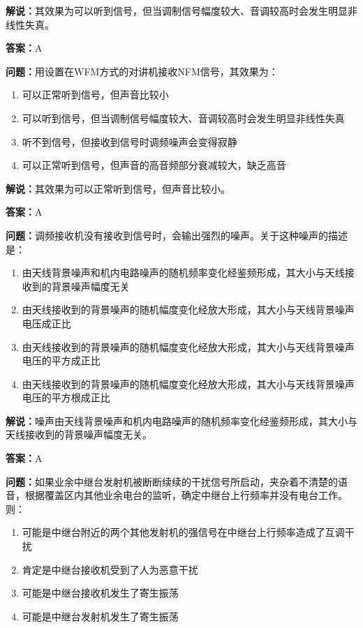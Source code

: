 \textbf{解说：}其效果为可以听到信号，但当调制信号幅度较大、音调较高时会发生明显非线性失真。%

\textbf{答案：}A

\textbf{问题：}用设置在WFM方式的对讲机接收NFM信号，其效果为：

\begin{enumerate}[label=\Alph*), leftmargin=3em]
	\item 可以正常听到信号，但声音比较小
	\item 可以听到信号，但当调制信号幅度较大、音调较高时会发生明显非线性失真
	\item 听不到信号，但接收到信号时调频噪声会变得寂静
	\item 可以正常听到信号，但声音的高音频部分衰减较大，缺乏高音
\end{enumerate}

\textbf{解说：}其效果为可以正常听到信号，但声音比较小。%

\textbf{答案：}A

\textbf{问题：}调频接收机没有接收到信号时，会输出强烈的噪声。关于这种噪声的描述是：

\begin{enumerate}[label=\Alph*), leftmargin=3em]
	\item 由天线背景噪声和机内电路噪声的随机频率变化经鉴频形成，其大小与天线接收到的背景噪声幅度无关
	\item 由天线接收到的背景噪声的随机幅度变化经放大形成，其大小与天线背景噪声电压成正比
	\item 由天线接收到的背景噪声的随机幅度变化经放大形成，其大小与天线背景噪声电压的平方成正比
	\item 由天线接收到的背景噪声的随机幅度变化经放大形成，其大小与天线背景噪声电压的平方根成正比
\end{enumerate}

\textbf{解说：}噪声由天线背景噪声和机内电路噪声的随机频率变化经鉴频形成，其大小与天线接收到的背景噪声幅度无关。%

\textbf{答案：}A

\textbf{问题：}如果业余中继台发射机被断断续续的干扰信号所启动，夹杂着不清楚的语音，根据覆盖区内其他业余电台的监听，确定中继台上行频率并没有电台工作。则：

\begin{enumerate}[label=\Alph*), leftmargin=3em]
	\item 可能是中继台附近的两个其他发射机的强信号在中继台上行频率造成了互调干扰
	\item 肯定是中继台接收机受到了人为恶意干扰
	\item 可能是中继台接收机发生了寄生振荡
	\item 可能是中继台发射机发生了寄生振荡
\end{enumerate}

